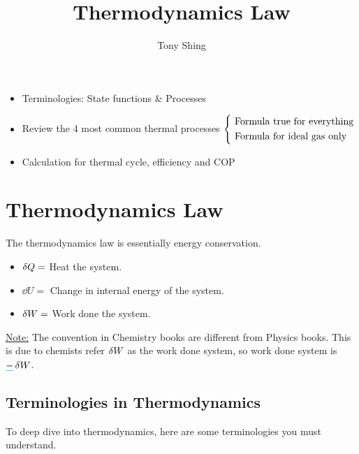 \documentclass[class=article, crop=false, 12pt]{standalone}
\author{Tony Shing}
\title{Thermodynamics \nth{1} Law}
\begin{document}
\maketitle


\begin{overview}
    \begin{itemize}
        \item Terminologies: State functions \& Processes
        \item Review the 4 most common thermal processes 
        $\left\{ \ \begin{aligned} 
            &\text{Formula true for everything} \\ 
            &\text{Formula for ideal gas only}
         \end{aligned}\right.$
        \item Calculation for thermal cycle, efficiency and COP
    \end{itemize}
\end{overview}


\section{Thermodynamics  Law}

The thermodynamics  law is essentially energy conservation.
\begin{itemize}
    \item $\var{Q} = $ Heat  the system.
    \item $\dd{U} = $ Change in internal energy of the system.
    \item $\var{W} = $ Work done  the system.
\end{itemize}

\ul{Note:} The convention in Chemistry books are different from Physics books.
This is due to chemists refer $\var{W}$ as the work done  system,
so work done  system is $\cul[blue]{-}\var{W}$.


\subsection{Terminologies in Thermodynamics}

To deep dive into thermodynamics, 
here are some terminologies you must understand.
\end{document}
